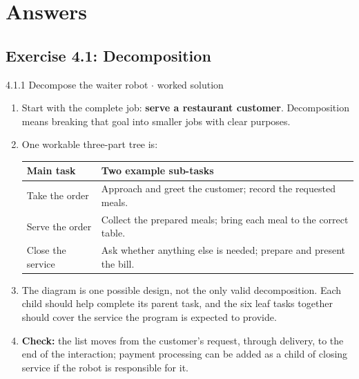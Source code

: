 \documentclass[11pt]{article}
\begin{document}
\section{Answers}
\begin{keepsection}\subsection{Exercise 4.1: Decomposition}

\begin{workedbox}{4.1.1 Decompose the waiter robot \ensuremath{\cdot} worked solution}
\begin{enumerate}
\item Start with the complete job: \textbf{serve a restaurant customer}. Decomposition means breaking that goal into smaller jobs with clear purposes.
\item {}
One workable three-part tree is:

\begin{center}\small\begin{tabularx}{\linewidth}{>{\raggedright\arraybackslash}X>{\raggedright\arraybackslash}X}\toprule
\textbf{Main task} & \textbf{Two example sub-tasks} \\ \midrule
Take the order & Approach and greet the customer; record the requested meals. \\
Serve the order & Collect the prepared meals; bring each meal to the correct table. \\
Close the service & Ask whether anything else is needed; prepare and present the bill. \\
\bottomrule\end{tabularx}\end{center}
\item The diagram is one possible design, not the only valid decomposition. Each child should help complete its parent task, and the six leaf tasks together should cover the service the program is expected to provide.
\item \textbf{Check:} the list moves from the customer's request, through delivery, to the end of the interaction; payment processing can be added as a child of closing service if the robot is responsible for it.
\end{enumerate}
\end{workedbox}

\end{keepsection}
\end{document}
